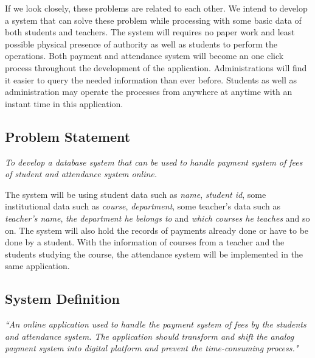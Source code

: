 If we look closely, these problems are related to each other. We intend to develop a system that can solve these problem while processing with some basic data of both students and teachers. The system will requires no paper work and least possible physical presence of authority as well as students to perform the operations. Both payment and attendance system will become an one click process throughout the development of the application. Administrations will find it easier to query the needed information than ever before. Students as well as administration may operate the processes from anywhere at anytime with an instant time in this application.

\subsection{Problem Statement}\label{subsec:ps} 

\emph{To develop a database system that can be used to handle payment system of fees of student and attendance system online.}

The system will be using student data such as \emph{name}, \emph{student id}, some institutional data such as \emph{course}, \emph{department}, some teacher's data such as \emph{teacher's name}, \emph{the department he belongs to} and \emph{which courses he teaches} and so on. The system will also hold the records of payments already done or have to be done by a student. With the information of courses from a teacher and the students studying the course, the attendance system will be implemented in the same application.

\clearpage

\subsection{System Definition}\label{subsec:sd} 

\textit{``An online application used to handle the payment system of fees by the students and attendance system. The application should transform and shift the analog payment system into digital platform and prevent the time-consuming process."}


